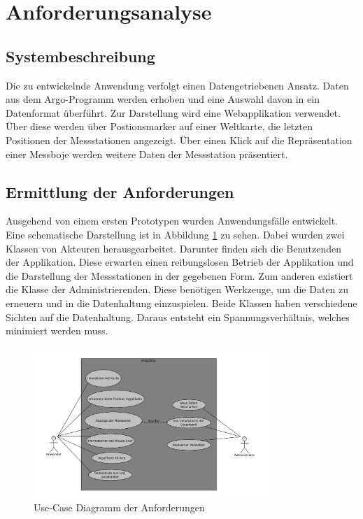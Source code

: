 \section{Anforderungsanalyse}

\subsection{Systembeschreibung}

    Die zu entwickelnde Anwendung verfolgt einen Datengetriebenen Ansatz. Daten aus dem Argo-Programm werden erhoben und eine Auswahl davon in ein Datenformat überführt. Zur Darstellung wird eine Webapplikation verwendet. Über diese werden   über Postionsmarker auf einer Weltkarte, die letzten Positionen der Messstationen angezeigt.  Über einen Klick auf die Repräsentation einer Messboje werden weitere Daten der Messstation präsentiert.



    \subsection{Ermittlung der Anforderungen}

    Ausgehend von einem ersten Prototypen wurden Anwendungsfälle entwickelt. Eine schematische Darstellung ist in Abbildung  \ref{fig:use_case} zu sehen. Dabei wurden zwei Klassen von Akteuren herausgearbeitet. Darunter finden sich die Benutzenden der Applikation. Diese erwarten einen reibungslosen Betrieb der Applikation und die Darstellung der Messstationen in der gegebenen Form. Zum anderen existiert die Klasse der Administrierenden. Diese benötigen Werkzeuge, um die Daten zu erneuern und in die Datenhaltung einzuspielen. Beide Klassen haben verschiedene Sichten auf die Datenhaltung. Daraus entsteht ein Spannungsverhältnis, welches minimiert werden muss.

    \begin{figure}[h!]
        \centering
        \includegraphics[width=0.8\textwidth]{pix/use-case.png}
        \caption{Use-Case Diagramm der Anforderungen}
        \label{fig:use_case}
    \end{figure}

